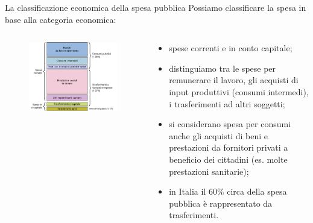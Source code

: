 \documentclass[11pt,italian]{beamer}
\begin{document}
\begin{frame}{La classificazione economica della spesa pubblica}
Possiamo classificare la spesa in base alla categoria economica:
\begin{columns}
\begin{column}{.6\columnwidth}
\begin{figure}
\centering
\includegraphics[width=1.1\textwidth]{./figure/spesa-pubblica-classificazione-economica-color.pdf}
\end{figure}
\end{column}

\begin{column}{.4\columnwidth}
\footnotesize
\begin{itemize}
\item spese correnti e in conto capitale;
\item distinguiamo tra le spese per remunerare il lavoro, gli acquisti di input produttivi (consumi intermedi), i trasferimenti ad altri soggetti;
\item si considerano spesa per consumi anche gli acquisti di beni e prestazioni da fornitori privati a beneficio dei cittadini (es. molte prestazioni sanitarie);
\item in Italia il 60\% circa della spesa pubblica è rappresentato da trasferimenti.
\end{itemize}
\end{column}
\end{columns}
\end{frame}
\end{document}
